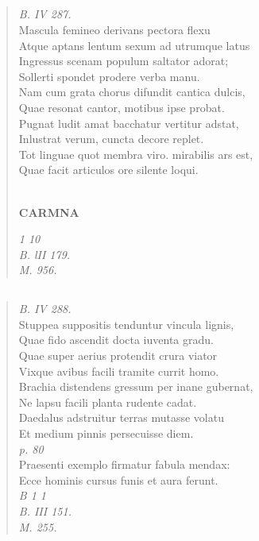 \documentclass[11pt, a4paper]{report}
\begin{document}
            \subsection*{}
      \begin{verse}
      \textit{B. IV 287.} \\ Mascula femineo derivans pectora flexu \\ Atque aptans lentum sexum ad utrumque latus \\ Ingressus scenam populum saltator adorat; \\ Sollerti spondet prodere verba manu. \\ Nam cum grata chorus difundit cantica dulcis, \\ Quae resonat cantor, motibus ipse probat. \\ Pugnat ludit amat bacchatur vertitur adstat, \\ Inlustrat verum, cuncta decore replet. \\ Tot linguae quot membra viro. mirabilis ars est, \\ Quae facit articulos ore silente loqui. \\ 
        ﻿\pagebreak 
    \begin{center} \textbf{CARMNA} \end{center} \marginpar{[130]} \textit{1 10} \\ \textit{B. lII 179.} \\ \textit{M. 956.} \\ 
      \end{verse}
  
            \subsection*{}
      \begin{verse}
      \textit{B. IV 288.} \\ Stuppea suppositis tenduntur vincula lignis, \\ Quae fido ascendit docta iuventa gradu. \\ Quae super aerius protendit crura viator \\ Vixque avibus facili tramite currit homo. \\ Brachia distendens gressum per inane gubernat, \\ Ne lapsu facili planta rudente cadat. \\ Daedalus adstruitur terras mutasse volatu \\ Et medium pinnis persecuisse diem. \\ \textit{p. 80} \\ Praesenti exemplo firmatur fabula mendax: \\ Ecce hominis cursus funis et aura ferunt. \\ \textit{B 1 1} \\ \textit{B. III 151.} \\ \textit{M. 255.} \\ 
      \end{verse}
  
\end{document}
